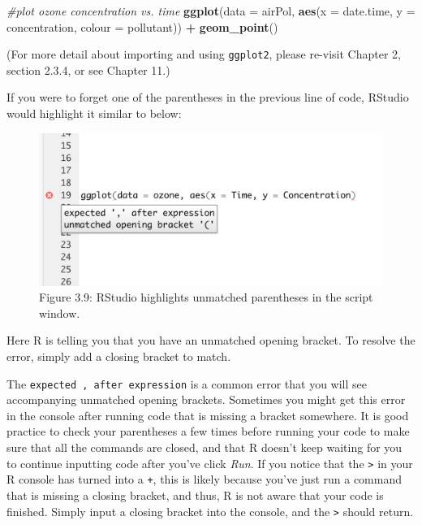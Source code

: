 \documentclass[
]{book}
\newenvironment{Shaded}{\begin{snugshade}}{\end{snugshade}}
\newcommand{\AttributeTok}[1]{\textcolor[rgb]{0.13,0.29,0.53}{#1}}
\newcommand{\CommentTok}[1]{\textcolor[rgb]{0.56,0.35,0.01}{\textit{#1}}}
\newcommand{\FunctionTok}[1]{\textcolor[rgb]{0.13,0.29,0.53}{\textbf{#1}}}
\newcommand{\NormalTok}[1]{#1}
\newcommand{\SpecialCharTok}[1]{\textcolor[rgb]{0.81,0.36,0.00}{\textbf{#1}}}
\begin{document}
\begin{Shaded}
\begin{Highlighting}[]
\CommentTok{\#plot ozone concentration vs. time}
\FunctionTok{ggplot}\NormalTok{(}\AttributeTok{data =}\NormalTok{ airPol, }
       \FunctionTok{aes}\NormalTok{(}\AttributeTok{x =}\NormalTok{ date.time,}
           \AttributeTok{y =}\NormalTok{ concentration,}
           \AttributeTok{colour =}\NormalTok{ pollutant)) }\SpecialCharTok{+}
  \FunctionTok{geom\_point}\NormalTok{()}
\end{Highlighting}
\end{Shaded}

(For more detail about importing and using \texttt{ggplot2}, please re-visit Chapter 2, section 2.3.4, or see Chapter 11.)

If you were to forget one of the parentheses in the previous line of code, RStudio would highlight it similar to below:

\begin{figure}
\centering
\includegraphics{images/Rstudio_unmatched.png}
\caption{Figure 3.9: RStudio highlights unmatched parentheses in the script window.}
\end{figure}

Here R is telling you that you have an unmatched opening bracket. To resolve the error, simply add a closing bracket to match.

The \texttt{expected\ \textquotesingle{},\textquotesingle{}\ after\ expression} is a common error that you will see accompanying unmatched opening brackets. Sometimes you might get this error in the console after running code that is missing a bracket somewhere. It is good practice to check your parentheses a few times before running your code to make sure that all the commands are closed, and that R doesn't keep waiting for you to continue inputting code after you've click \emph{Run}. If you notice that the \texttt{\textgreater{}} in your R console has turned into a \texttt{+}, this is likely because you've just run a command that is missing a closing bracket, and thus, R is not aware that your code is finished. Simply input a closing bracket into the console, and the \texttt{\textgreater{}} should return.
\end{document}
